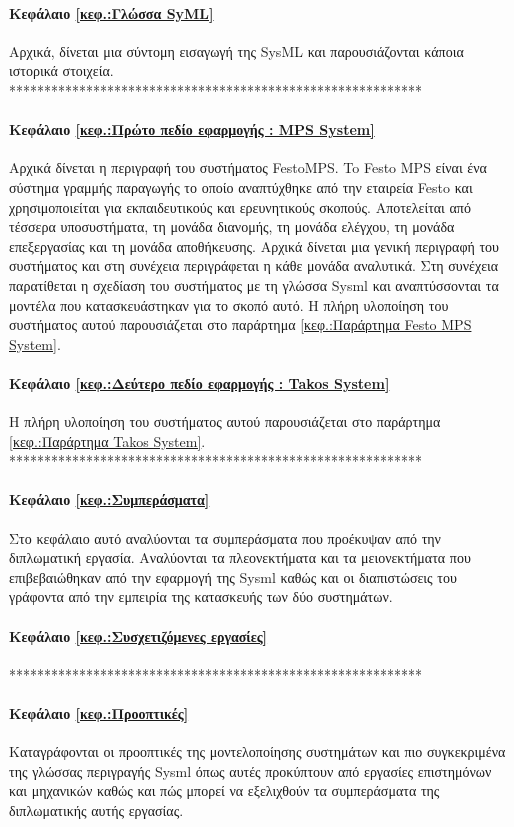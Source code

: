 \documentclass[a4paper,12pt,twoside]{report}
\begin{document}
		\paragraph{Κεφάλαιο \ref{κεφ.:Γλώσσα SyML}} {Αρχικά, δίνεται μια σύντομη εισαγωγή της SysML και παρουσιάζονται κάποια ιστορικά στοιχεία.
		***********************************************************
		}
		\paragraph{Κεφάλαιο \ref{κεφ.:Πρώτο πεδίο εφαρμογής : MPS System}} {Αρχικά δίνεται η περιγραφή του συστήματος FestoMPS. To Festo MPS είναι ένα σύστημα γραμμής παραγωγής το οποίο αναπτύχθηκε από την εταιρεία Festo και χρησιμοποιείται για εκπαιδευτικούς και ερευνητικούς σκοπούς. Αποτελείται από τέσσερα υποσυστήματα, τη μονάδα διανομής, τη μονάδα ελέγχου, τη μονάδα επεξεργασίας και τη μονάδα αποθήκευσης. Αρχικά δίνεται μια γενική περιγραφή του συστήματος και στη συνέχεια περιγράφεται η κάθε μονάδα αναλυτικά. Στη συνέχεια παρατίθεται η σχεδίαση του συστήματος με τη γλώσσα Sysml και αναπτύσσονται τα μοντέλα που κατασκευάστηκαν για το σκοπό αυτό. Η πλήρη υλοποίηση του συστήματος αυτού παρουσιάζεται στο παράρτημα \ref{κεφ.:Παράρτημα Festo MPS System}.
		}
		\paragraph{Κεφάλαιο \ref{κεφ.:Δεύτερο πεδίο εφαρμογής : Takos System}} {Η πλήρη υλοποίηση του συστήματος αυτού παρουσιάζεται στο παράρτημα \ref{κεφ.:Παράρτημα Takos System}.
		***********************************************************
		}
		\paragraph{Κεφάλαιο \ref{κεφ.:Συμπεράσματα}} {Στο κεφάλαιο αυτό αναλύονται τα συμπεράσματα που προέκυψαν από την διπλωματική εργασία. Αναλύονται τα πλεονεκτήματα και τα μειονεκτήματα που επιβεβαιώθηκαν από την εφαρμογή της Sysml καθώς και οι διαπιστώσεις του γράφοντα από την εμπειρία της κατασκευής των δύο συστημάτων.
		}
		\paragraph{Κεφάλαιο \ref{κεφ.:Συσχετιζόμενες εργασίες}} {***********************************************************
		}
		\paragraph{Κεφάλαιο \ref{κεφ.:Προοπτικές}} {Καταγράφονται οι προοπτικές της μοντελοποίησης συστημάτων και πιο συγκεκριμένα της γλώσσας περιγραγής Sysml όπως αυτές προκύπτουν από εργασίες επιστημόνων και μηχανικών καθώς και πώς μπορεί να εξελιχθούν τα συμπεράσματα της διπλωματικής αυτής εργασίας.
		}
\end{document}
